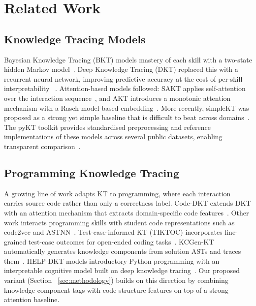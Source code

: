 \section{Related Work}
\label{sec:related}

\subsection{Knowledge Tracing Models}
Bayesian Knowledge Tracing (BKT) models mastery of each skill with a
two-state hidden Markov model~\cite{corbett1994bkt}. Deep Knowledge
Tracing (DKT) replaced this with a recurrent neural network, improving
predictive accuracy at the cost of per-skill interpretability~%
\cite{piech2015dkt}. Attention-based models followed: SAKT applies
self-attention over the interaction sequence~\cite{pandey2019sakt}, and
AKT introduces a monotonic attention mechanism with a
Rasch-model-based embedding~\cite{ghosh2020akt}. More recently, simpleKT
was proposed as a strong yet simple baseline that is difficult to beat
across domains~\cite{liu2023simplekt}. The pyKT toolkit provides
standardised preprocessing and reference implementations of these models
across several public datasets, enabling transparent
comparison~\cite{liu2022pykt}.

\subsection{Programming Knowledge Tracing}
A growing line of work adapts KT to programming, where each interaction
carries source code rather than only a correctness label. Code-DKT
extends DKT with an attention mechanism that extracts domain-specific
code features~\cite{shi2022codedkt}. Other work interacts programming
skills with student code representations such as code2vec and
ASTNN~\cite{pktattn2021}. Test-case-informed KT (TIKTOC) incorporates
fine-grained test-case outcomes for open-ended coding
tasks~\cite{tiktoc2025}. KCGen-KT automatically generates knowledge
components from solution ASTs and traces them~\cite{kcgenkt2026}.
HELP-DKT models introductory Python programming with an interpretable
cognitive model built on deep knowledge tracing~\cite{helpdkt2022}. Our proposed variant (Section~%
\ref{sec:methodology}) builds on this direction by combining
knowledge-component tags with code-structure features on top of a strong
attention baseline.

